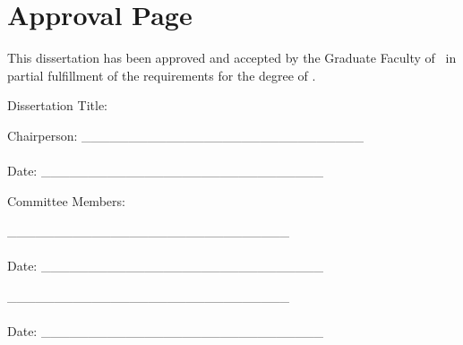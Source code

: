 \chapter*{Approval Page}

\vspace{0.5in}

\noindent
This dissertation has been approved and accepted by the Graduate Faculty of \universityname\ in partial fulfillment of the requirements for the degree of \degreeawarded.

\vspace{1in}

Dissertation Title: \dissertationtitle

\vspace{1in}

Chairperson: \_\_\_\_\_\_\_\_\_\_\_\_\_\_\_\_\_\_\_\_\_\_\_\_\_\_\_\_\_\_\\[0.5in]
\chairname\\[0.5in]
Date: \_\_\_\_\_\_\_\_\_\_\_\_\_\_\_\_\_\_\_\_\_\_\_\_\_\_\_\_\_\_

\vspace{0.5in}

Committee Members:

\_\_\_\_\_\_\_\_\_\_\_\_\_\_\_\_\_\_\_\_\_\_\_\_\_\_\_\_\_\_\\[0.5in]
\committeemembertwo\\[0.5in]
Date: \_\_\_\_\_\_\_\_\_\_\_\_\_\_\_\_\_\_\_\_\_\_\_\_\_\_\_\_\_\_

\vspace{0.5in}

\_\_\_\_\_\_\_\_\_\_\_\_\_\_\_\_\_\_\_\_\_\_\_\_\_\_\_\_\_\_\\[0.5in]
\committeememberthree\\[0.5in]
Date: \_\_\_\_\_\_\_\_\_\_\_\_\_\_\_\_\_\_\_\_\_\_\_\_\_\_\_\_\_\_

\newpage